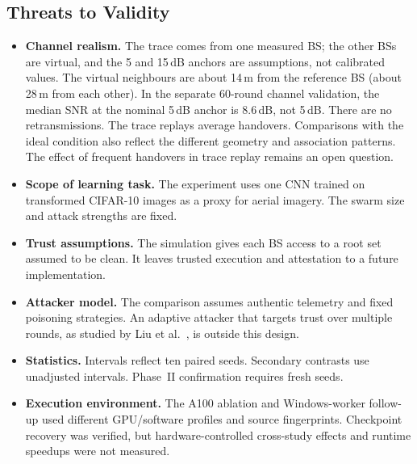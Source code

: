 \subsection{Threats to Validity}
\begin{itemize}
\item \textbf{Channel realism.} The trace comes from one measured BS; the other BSs
  are virtual, and the 5 and 15\,dB anchors are assumptions, not calibrated values.
  The virtual neighbours are about 14\,m from the reference BS (about 28\,m from
  each other). In the separate 60-round channel validation, the median SNR at
  the nominal 5\,dB anchor is 8.6\,dB, not 5\,dB. There are no retransmissions.
  The trace replays average \TraceHandovers{} handovers. Comparisons with the
  ideal condition also reflect the different geometry and association patterns.
  The effect of frequent handovers in trace replay remains an open question.
\item \textbf{Scope of learning task.} The experiment uses one CNN trained on
  transformed CIFAR-10 images as a proxy for aerial imagery. The swarm size and
  attack strengths are fixed.
\item \textbf{Trust assumptions.} The simulation gives each BS access to a root
  set assumed to be clean. It leaves trusted execution and attestation to a future
  implementation.
\item \textbf{Attacker model.} The comparison assumes authentic telemetry and
  fixed poisoning strategies. An adaptive attacker that targets trust over
  multiple rounds, as studied by Liu et al.~\cite{liu2026evade}, is outside this
  design.
\item \textbf{Statistics.} Intervals reflect ten paired seeds. Secondary contrasts
  use unadjusted intervals. Phase~II confirmation requires fresh seeds.
\item \textbf{Execution environment.} The A100 ablation and Windows-worker follow-up
  used different GPU/software profiles and source fingerprints. Checkpoint recovery
  was verified, but hardware-controlled cross-study effects and runtime speedups
  were not measured.
\end{itemize}
